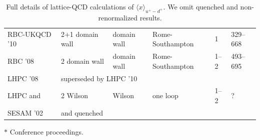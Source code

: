 \begin{table}[!t]
\begin{threeparttable}
\begin{tabular}{llllll}
  RBC-UKQCD '10 \cite{Aoki:2010xg} &
  2+1 domain wall & domain wall & Rome-Southampton & 1 & 329--668 \\

  RBC '08 \cite{Lin:2008uz} &
  2 domain wall & domain wall & Rome-Southampton & 1--2 & 493--695 \\

  LHPC '08 \cite{Hagler:2007xi} &
  \multicolumn{5}{l}{superseded by LHPC '10} \\

  LHPC and &
  2 Wilson & Wilson & one loop & 1--2 & ?\\
  SESAM '02 \cite{Dolgov:2002zm} &
  and quenched & & & \\
\bottomrule
\end{tabular}
\begin{tablenotes}
\scriptsize
\item[$*$] Conference proceedings.
\end{tablenotes}
\end{threeparttable}
\caption{\small Full details of lattice-QCD calculations of 
$\langle x\rangle_{u^+-d^+}$. We omit quenched and non-renormalized results.}
\label{tab:unpolarizedisotriplet}
\end{table}


